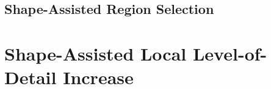 


\subsection{Shape-Assisted Region Selection}
\section{Shape-Assisted Local Level-of-Detail Increase}
